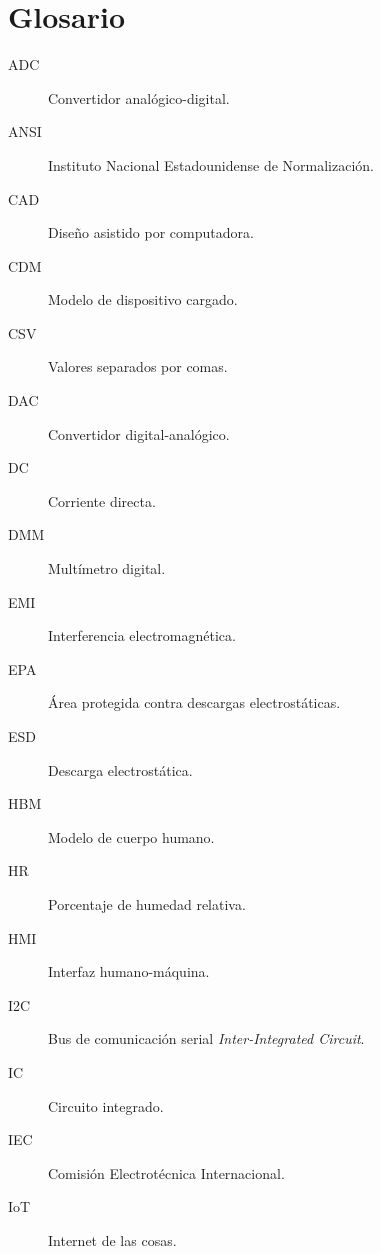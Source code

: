 \chapter*{Glosario}

\begin{description}
    \item[ADC] Convertidor analógico-digital.
    
    \item[ANSI] Instituto Nacional Estadounidense de Normalización.
    
    \item[CAD] Diseño asistido por computadora.
    
    \item[CDM] Modelo de dispositivo cargado.
    
    \item[CSV] Valores separados por comas.
    
    \item[DAC] Convertidor digital-analógico.
    
    \item[DC] Corriente directa.
    
    \item[DMM] Multímetro digital.
    
    \item[EMI] Interferencia electromagnética.
    
    \item[EPA] Área protegida contra descargas electrostáticas.
    
    \item[ESD] Descarga electrostática.
    
    \item[HBM] Modelo de cuerpo humano.
    
    \item[HR] Porcentaje de humedad relativa.
    
    \item[HMI] Interfaz humano-máquina.
    
    \item[I2C] Bus de comunicación serial \textit{Inter-Integrated Circuit}.
    
    \item[IC] Circuito integrado.
    
    \item[IEC] Comisión Electrotécnica Internacional.
    
    \item[IoT] Internet de las cosas.
    

\end{description}
